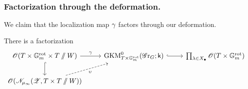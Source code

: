 \subsubsection{Factorization through the deformation.}
We claim that the localization map $\gamma$ factors through our deformation.
\begin{lemma}
There is a factorization
\begin{equation*}
\begin{tikzcd}
    \O(T \times \Gm^{\rot} \times T \sslash W) \arrow[r, "\loc"] \arrow[d, hookrightarrow]& \GKM^{0}_{T \times \Gm^{\rot}}(\Gr_G; \k) \arrow[r, hookrightarrow] &  \prod_{\lambda \in X_{\bullet}} \O(T \times \Gm^{\rot})\\
    \O(\eN_{\mu_{\infty}}(\eZ, T \times T \sslash W)) \arrow[ru, swap, dashed, "\bloc"]
\end{tikzcd}
\end{equation*}
\end{lemma}
